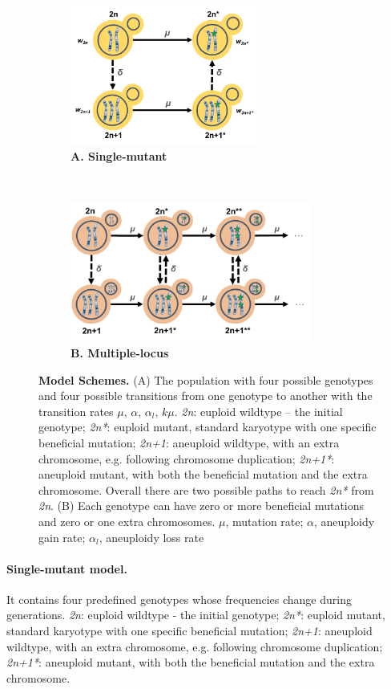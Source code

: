 \documentclass[12pt]{extarticle}
\begin{document}
\begin{figure}[b!]
  \centering
  \begin{subfigure}[t]{0.5\textwidth}
      \centering
      \includegraphics[height=1.8in]{../figures/Fig1-A.pdf}
      \caption{
        \textbf{A. Single-mutant}
        }
      \label{fig:model1}
  \end{subfigure}%
  ~ 
  \begin{subfigure}[t]{0.5\textwidth}
      \centering
      \includegraphics[height=1.8in]{../figures/Fig1-B.pdf}
      \caption{
        \textbf{B. Multiple-locus}
      }
      \label{fig:model2}
  \end{subfigure}
  \caption{
    \textbf{Model Schemes.} (A) The population with four possible genotypes and four possible transitions from one genotype to another with the transition rates $\mu$, $\alpha$, 
    $\alpha_l$, $k\mu$. \emph{2n}: euploid wildtype – the initial genotype; \emph{2n*}: euploid mutant, standard karyotype with one specific beneficial mutation; 
    \emph{2n+1}: aneuploid wildtype, with an extra chromosome, e.g. following chromosome duplication; \emph{2n+1*}: 
    aneuploid mutant, with both the beneficial mutation and the extra chromosome. Overall there are two possible paths to reach \emph{2n*} from \emph{2n}.
    (B) Each genotype can have zero or more beneficial mutations and zero or one extra chromosomes. $\mu$, mutation rate; $\alpha$, aneuploidy gain rate; $\alpha_l$, aneuploidy loss rate
  }
  \label{fig:models}
\end{figure}

\paragraph*{Single-mutant model.} It contains four predefined genotypes whose frequencies change during generations. \emph{2n}: euploid wildtype - the initial genotype; 
\emph{2n*}: euploid mutant, standard karyotype with one specific beneficial mutation; \emph{2n+1}: aneuploid wildtype, with an extra chromosome, e.g. following chromosome duplication; 
\emph{2n+1*}: aneuploid mutant, with both the beneficial mutation and the extra chromosome. 
\end{document}
